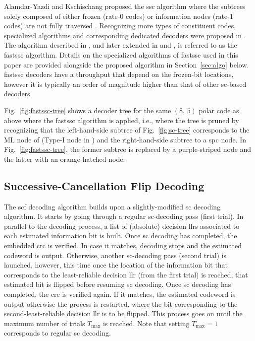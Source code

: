 \documentclass[conference]{IEEEtran}
\begin{document}
Alamdar-Yazdi and Kschischang proposed the \gls{ssc} algorithm where the subtrees solely composed of either frozen (rate-0 codes) or information nodes (rate-1 codes) are not fully traversed \cite{Alamdar-Yazdi2011}. Recognizing more types of constituent codes, specialized algorithms and corresponding dedicated decoders were proposed in \cite{Sarkis_JSAC_2014}. The algorithm described in \cite{Sarkis_JSAC_2014}, and later extended in \cite{Giard_JSPS_2016b} and \cite{Hanif2017}, is referred to as the \gls{fastssc} algorithm. Details on the specialized algorithms of \gls{fastssc} used in this paper are provided alongside the proposed algorithm in Section~\ref{sec:algo} below. \Gls{fastssc} decoders have a throughput that depend on the frozen-bit locations, however it is typically an order of magnitude higher than that of other \gls{sc}-based decoders.

Fig.~\ref{fig:fastssc-tree} shows a decoder tree for the same $(8,\,5)$ polar code as above where the \gls{fastssc} algorithm is applied, i.e., where the tree is pruned by recognizing that the left-hand-side subtree of Fig.~\ref{fig:sc-tree} corresponds to the ML node of \cite{Sarkis_JSAC_2014} (Type-I node in \cite{Hanif2017}) and the right-hand-side subtree to a \gls{spc} node. In Fig.~\ref{fig:fastssc-tree}, the former subtree is replaced by a purple-striped node and the latter with an orange-hatched node.

\subsection{Successive-Cancellation Flip Decoding}
The \gls{scf} decoding algorithm builds upon a slightly-modified \gls{sc} decoding algorithm.
It starts by going through a regular \gls{sc}-decoding pass (first trial). In parallel to the decoding process, a list of (absolute) decision \glspl{llr} associated to each estimated information bit is built. Once \gls{sc} decoding has completed, the embedded \gls{crc} is verified. In case it matches, decoding stops and the estimated codeword is output. Otherwise, another \gls{sc}-decoding pass (second trial) is launched, however, this time once the location of the information bit that corresponds to the least-reliable decision \gls{llr} (from the first trial) is reached, that estimated bit is flipped before resuming \gls{sc} decoding. Once \gls{sc} decoding has completed, the \gls{crc} is verified again. If it matches, the estimated codeword is output otherwise the process is restarted, where the bit corresponding to the second-least-reliable decision \gls{llr} is to be flipped. This process goes on until the maximum number of trials $T_{\max}$ is reached. Note that setting $T_{\max}=1$  corresponds to regular \gls{sc} decoding.
\end{document}
